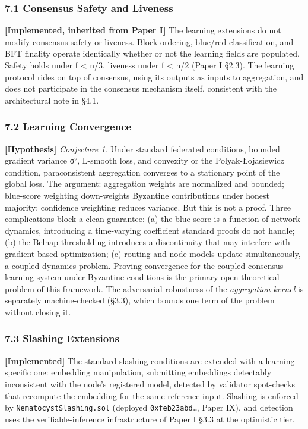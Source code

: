 \subsubsection{7.1 Consensus Safety and
Liveness}\label{consensus-safety-and-liveness}

\textbf{{[}Implemented, inherited from Paper I{]}} The learning
extensions do not modify consensus safety or liveness. Block ordering,
blue/red classification, and BFT finality operate identically whether or
not the learning fields are populated. Safety holds under f \textless{}
n/3, liveness under f \textless{} n/2 (Paper I §2.3). The learning
protocol rides on top of consensus, using its outputs as inputs to
aggregation, and does not participate in the consensus mechanism itself,
consistent with the architectural note in §4.1.

\subsubsection{7.2 Learning Convergence}\label{learning-convergence}

\textbf{{[}Hypothesis{]}} \emph{Conjecture 1.} Under standard federated
conditions, bounded gradient variance σ², L-smooth loss, and convexity
or the Polyak-Łojasiewicz condition, paraconsistent aggregation
converges to a stationary point of the global loss. The argument:
aggregation weights are normalized and bounded; blue-score weighting
down-weights Byzantine contributions under honest majority; confidence
weighting reduces variance. But this is not a proof. Three complications
block a clean guarantee: (a) the blue score is a function of network
dynamics, introducing a time-varying coefficient standard proofs do not
handle; (b) the Belnap thresholding introduces a discontinuity that may
interfere with gradient-based optimization; (c) routing and node models
update simultaneously, a coupled-dynamics problem. Proving convergence
for the coupled consensus-learning system under Byzantine conditions is
the primary open theoretical problem of this framework. The adversarial
robustness of the \emph{aggregation kernel} is separately
machine-checked (§3.3), which bounds one term of the problem without
closing it.

\subsubsection{7.3 Slashing Extensions}\label{slashing-extensions}

\textbf{{[}Implemented{]}} The standard slashing conditions are extended
with a learning-specific one: embedding manipulation, submitting
embeddings detectably inconsistent with the node's registered model,
detected by validator spot-checks that recompute the embedding for the
same reference input. Slashing is enforced by
\texttt{NematocystSlashing.sol} (deployed \texttt{0xfeb23abd…}, Paper
IX), and detection uses the verifiable-inference infrastructure of Paper
I §3.3 at the optimistic tier.

